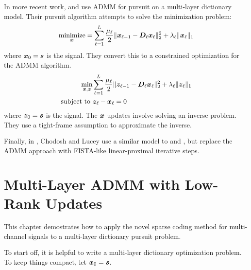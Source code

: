 In more recent work, \cite{murdock2018deep} and \cite{chodosh2018deep} use ADMM for pursuit on a multi-layer dictionary model. Their pursuit algorithm attempts to solve the minimization problem:
\begin{equation}
\operatorname*{\text{minimize}}_{\bm{x}} = \sum_{\ell = 1}^{L} \frac{\mu_{\ell}}{2}\|\bm{x}_{\ell - 1} -\bm{D}_{\ell}\bm{x}_{\ell}\|_2^2 + \lambda_{\ell}\|\bm{x}_{\ell}\|_1
\end{equation}
where $\bm{x}_0 = \bm{s}$ is the signal. They convert this to a constrained optimization for the ADMM algorithm.
\begin{equation}
\begin{aligned}
\min_{\bm{x},\bm{z}} & \sum_{\ell = 1}^{L} \frac{\mu_{\ell}}{2}\|\bm{z}_{\ell - 1} -\bm{D}_{\ell}\bm{x}_{\ell}\|_2^2 + \lambda_{\ell}\|\bm{z}_{\ell}\|_1 \\
\text{subject to } & \bm{z}_{\ell} - \bm{x}_{\ell} = 0
\end{aligned} \label{equation:ADMM Multi-Layer Pursuit Objective}
\end{equation}
where $\bm{z}_0 = \bm{s}$ is the signal. The $\bm{x}$ updates involve solving an inverse problem. They use a tight-frame assumption to approximate the inverse.

Finally, in \cite{chodosh2020use}, Chodosh and Lucey use a similar model to \cite{murdock2018deep} and \cite{chodosh2018deep}, but replace the ADMM approach with FISTA-like linear-proximal iterative steps.

\section{Multi-Layer ADMM with Low-Rank Updates}
This chapter demostrates how to apply the novel sparse coding method for multi-channel signals to a multi-layer dictionary pursuit problem.

To start off, it is helpful to write a multi-layer dictionary optimization problem. To keep things compact, let $\bm{x}_0 = \bm{s}$.

